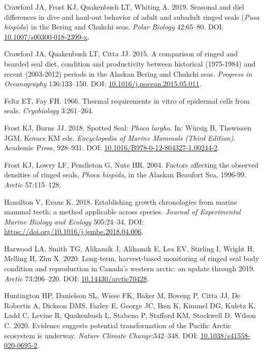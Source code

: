 \documentclass[fleqn,10pt,lineno]{wlpeerj} %
\newlength{\cslhangindent}
\newenvironment{CSLReferences}[2] %
 {\begin{list}{}{%
  \setlength{\itemindent}{0pt}
  \setlength{\leftmargin}{0pt}
  \setlength{\parsep}{0pt}
  \ifodd #1
   \setlength{\leftmargin}{\cslhangindent}
   \setlength{\itemindent}{-1\cslhangindent}
  \fi
  \setlength{\itemsep}{#2\baselineskip}}}
 {\end{list}}
\begin{document}
\begin{CSLReferences}{1}{0}
Crawford JA, Frost KJ, Quakenbush LT, Whiting A. 2019. Seasonal and diel differences in dive and haul-out behavior of adult and subadult ringed seals (\emph{Pusa hispida}) in the Bering and Chukchi seas. \emph{Polar Biology} 42:65--80. DOI: \href{https://doi.org/10.1007/s00300-018-2399-x}{10.1007/s00300-018-2399-x}.

Crawford JA, Quakenbush LT, Citta JJ. 2015. A comparison of ringed and bearded seal diet, condition and productivity between historical (1975-1984) and recent (2003-2012) periods in the Alaskan Bering and Chukchi seas. \emph{Progress in Oceanography} 136:133--150. DOI: \href{https://doi.org/10.1016/j.pocean.2015.05.011}{10.1016/j.pocean.2015.05.011}.

Feltz ET, Fay FH. 1966. Thermal requirements in vitro of epidermal cells from seals. \emph{Cryobiology} 3:261--264.

Frost KJ, Burns JJ. 2018. Spotted Seal: \emph{Phoca largha}. In: Würsig B, Thewissen JGM, Kovacs KM eds. \emph{Encyclopedia of Marine Mammals (Third Edition)}. Academic Press, 928--931. DOI: \href{https://doi.org/10.1016/B978-0-12-804327-1.00244-2}{10.1016/B978-0-12-804327-1.00244-2}.

Frost KJ, Lowry LF, Pendleton G, Nute HR. 2004. Factors affecting the observed densities of ringed seals, \emph{Phoca hispida}, in the Alaskan Beaufort Sea, 1996-99. \emph{Arctic} 57:115--128.

Hamilton V, Evans K. 2018. Establishing growth chronologies from marine mammal teeth: a method applicable across species. \emph{Journal of Experimental Marine Biology and Ecology} 505:24--34. DOI: \url{https://doi.org/10.1016/j.jembe.2018.04.006}.

Harwood LA, Smith TG, Alikamik J, Alikamik E, Lea EV, Stirling I, Wright H, Melling H, Zhu X. 2020. Long-term, harvest-based monitoring of ringed seal body condition and reproduction in Canada's western arctic: an update through 2019. \emph{Arctic} 73:206--220. DOI: \href{https://doi.org/10.14430/arctic70428}{10.14430/arctic70428}.

Huntington HP, Danielson SL, Wiese FK, Baker M, Boveng P, Citta JJ, De Robertis A, Dickson DMS, Farley E, George JC, Iken K, Kimmel DG, Kuletz K, Ladd C, Levine R, Quakenbush L, Stabeno P, Stafford KM, Stockwell D, Wilson C. 2020. Evidence suggests potential transformation of the Pacific Arctic ecosystem is underway. \emph{Nature Climate Change}:342--348. DOI: \href{https://doi.org/10.1038/s41558-020-0695-2}{10.1038/s41558-020-0695-2}.


\end{CSLReferences}
\end{document}
